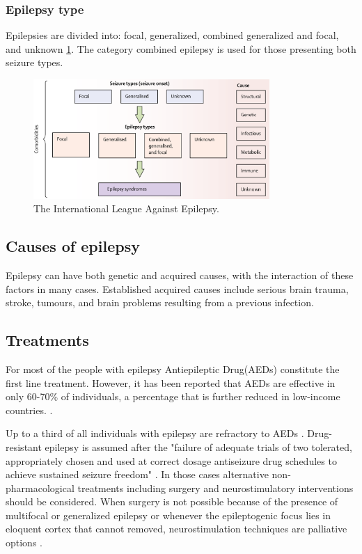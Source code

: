     \subsubsection*{Epilepsy type}
    Epilepsies are divided into: focal, generalized, combined generalized and focal, and unknown \ref{fig:Classification of epilepsies}. The category combined epilepsy is used for those presenting both seizure types.

    \begin{figure}[h]
      \centering
      \includegraphics[width=0.8\textwidth]{images/epilepsyTypes.png}
      \caption{The International League Against Epilepsy.\cite{THIJS2019689, classification}}
      \label{fig:Classification of epilepsies}
    \end{figure}
  
  \subsection*{Causes of epilepsy}
  Epilepsy can have both genetic and acquired causes, with the interaction of these factors in many cases. Established acquired causes include serious brain trauma, stroke, tumours, and brain problems resulting from a previous infection.

  \subsection*{Treatments}
  For most of the people with epilepsy Antiepileptic Drug(AEDs) constitute the first line treatment. However, it has been reported that AEDs are effective in only 60-70\% of individuals, a percentage that is further reduced in low-income countries. \cite{DUNCAN2006}.

  Up to a third of all individuals with epilepsy are refractory to AEDs \cite{SpencerHuh2008}. Drug-resistant epilepsy is assumed after the "failure of adequate trials of two tolerated, appropriately chosen and used at correct dosage antiseizure drug schedules to achieve sustained seizure freedom" \cite{drug_resist}. In those cases alternative non-pharmacological treatments including surgery and neurostimulatory interventions should be considered.
  When surgery is not possible because of the presence of multifocal or generalized epilepsy or whenever the epileptogenic focus lies in eloquent cortex that cannot removed, neurostimulation techniques are palliative options \cite{Englot2013}.

